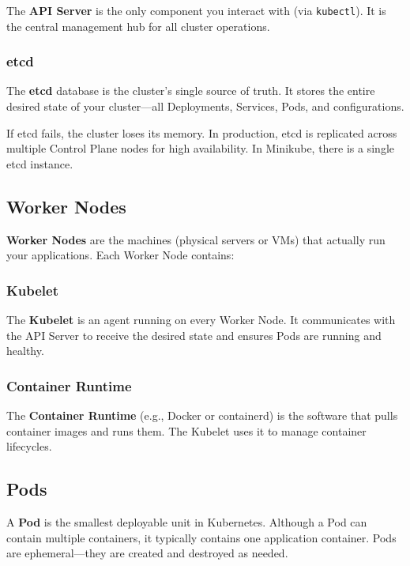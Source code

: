 \documentclass[12pt,a4paper]{article}
\begin{document}
The \textbf{API Server} is the only component you interact with (via \texttt{kubectl}). It is the central management hub for all cluster operations.

\subsubsection{etcd}

The \textbf{etcd} database is the cluster's single source of truth. It stores the entire desired state of your cluster—all Deployments, Services, Pods, and configurations.

\begin{importantbox}
If etcd fails, the cluster loses its memory. In production, etcd is replicated across multiple Control Plane nodes for high availability. In Minikube, there is a single etcd instance.
\end{importantbox}

\subsection{Worker Nodes}

\textbf{Worker Nodes} are the machines (physical servers or VMs) that actually run your applications. Each Worker Node contains:

\subsubsection{Kubelet}

The \textbf{Kubelet} is an agent running on every Worker Node. It communicates with the API Server to receive the desired state and ensures Pods are running and healthy.

\subsubsection{Container Runtime}

The \textbf{Container Runtime} (e.g., Docker or containerd) is the software that pulls container images and runs them. The Kubelet uses it to manage container lifecycles.

\subsection{Pods}

A \textbf{Pod} is the smallest deployable unit in Kubernetes. Although a Pod can contain multiple containers, it typically contains one application container. Pods are ephemeral—they are created and destroyed as needed.
\end{document}
